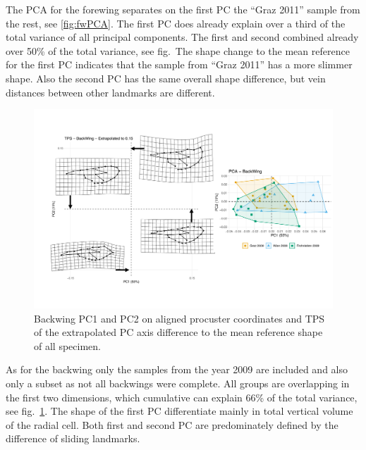 \documentclass[
]{article}
\begin{document}
The PCA for the forewing separates on the first PC the ``Graz 2011'' sample from the rest, see \ref{fig:fwPCA}. The first PC does already explain over a third of the total variance of all principal components. The first and second combined already over 50\% of the total variance, see fig.~The shape change to the mean reference for the first PC indicates that the sample from ``Graz 2011'' has a more slimmer shape. Also the second PC has the same overall shape difference, but vein distances between other landmarks are different.



\begin{figure}[H]

{\centering \includegraphics[width=0.8\linewidth,]{images/bwPCA} 

}

\caption{Backwing PC1 and PC2 on aligned procuster coordinates and TPS of the extrapolated PC axis difference to the mean reference shape of all specimen.}\label{fig:bwPCA}
\end{figure}

As for the backwing only the samples from the year 2009 are included and also only a subset as not all backwings were complete. All groups are overlapping in the first two dimensions, which cumulative can explain 66\% of the total variance, see fig.~\ref{fig:bwPCA}. The shape of the first PC differentiate mainly in total vertical volume of the radial cell. Both first and second PC are predominately defined by the difference of sliding landmarks.
\end{document}
